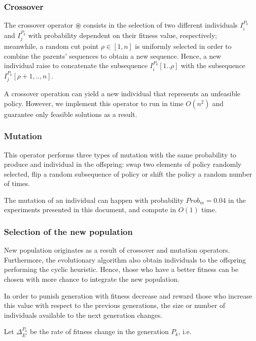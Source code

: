 \subsubsection*{Crossover}

The crossover operator $\circledast$ consists in the selection of two different individuals $I^{P_k}_i$ and $I^{P_k}_j$ with probability dependent on their fitness value, respectively; meanwhile, a random cut point $\rho \in [1,n]$ is uniformly selected in order to combine the parents' sequences to obtain a new sequence. Hence, a new individual raise to concatenate the subsequence $I^{P_k}_i[1..\rho]$ with the subsequence $I^{P_k}_j[\rho+1,..,n]$. 

A crossover operation can yield a new individual that represents an unfeasible policy. However, we implement this operator to run in time $O(n^2)$ and guarantee only feasible solutions as a result.


\subsubsection*{Mutation}

This operator performs three types of mutation with the same probability to produce and individual in the offspring: swap two elements of policy randomly selected, flip a random subsequence of policy or shift the policy a random number of times.

The mutation of an individual can happen with probability $Prob_m = 0.04$ in the experiments presented in this document, and compute in $O(1)$ time.


\subsubsection*{Selection of the new population}

New population originates as a result of crossover and mutation operators. Furthermore, the evolutionary algorithm also obtain individuals to the offspring performing the cyclic heuristic. Hence, those who have a better fitness can be chosen with more chance to integrate the new population.

In order to punish generation with fitness decrease and reward those who increase this value with respect to the previous generations, the size or number of individuals available to the next generation changes.

Let $\Delta^{P_k}_{E'}$ be the rate of fitness change in the generation $P_k$, i.e.

